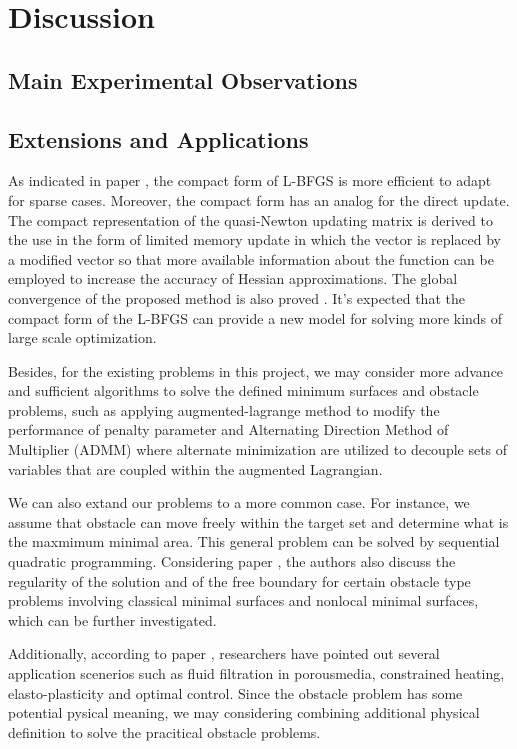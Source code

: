 \section{Discussion}
\subsection{Main Experimental Observations}
\subsection{Extensions and Applications}
As indicated in paper \cite{yueting2007compact}, the compact form of L-BFGS is more efficient to adapt for sparse cases. Moreover, the compact form has an analog for the direct update. The compact representation of the quasi-Newton updating matrix is derived to the use in the form of limited memory update in which the vector is replaced by a modified vector so that more available information about the function can be employed to increase the accuracy of Hessian approximations. The global convergence of the proposed method is also proved \cite{yueting2007compact}. It’s expected that the compact form of the L-BFGS can provide a new model for solving more kinds of large scale optimization. 

Besides, for the existing problems in this project, we may consider more advance and sufficient algorithms to solve the defined minimum surfaces and obstacle problems, such as applying augmented-lagrange method to modify the performance of penalty parameter and Alternating Direction Method of Multiplier (ADMM) where alternate minimization are utilized to decouple sets of variables that are coupled within the augmented Lagrangian.

We can also extand our problems to a more common case. For instance, we assume that obstacle can move freely within the target set and determine what is the maxmimum minimal area. This general problem can be solved by 
sequential quadratic programming. Considering paper \cite{caffarelli2016obstacle}, the authors also discuss the regularity of the solution and of the free boundary for certain obstacle type problems involving classical minimal surfaces and nonlocal minimal surfaces, which can be further investigated.

Additionally, according to paper \cite{attouch2014variational}, researchers have pointed out several application scenerios such as fluid filtration in porousmedia, constrained heating, elasto-plasticity and optimal control. Since the obstacle problem has some potential pysical meaning, we may considering combining additional physical definition to solve the pracitical obstacle problems.